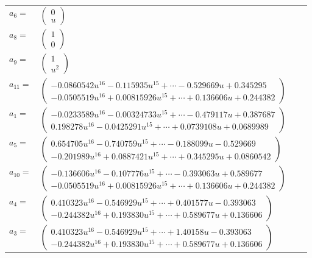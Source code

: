 \documentclass[1p]{elsarticle_modified}
\theoremstyle{definition}
\begin{document}
\begin{tabular}{m{7pt} m{180pt} m{7pt} m{180pt} }
\flushright $a_{6}=$&$\begin{pmatrix}0\\u\end{pmatrix}$ \\
\flushright $a_{8}=$&$\begin{pmatrix}1\\0\end{pmatrix}$ \\
\flushright $a_{9}=$&$\begin{pmatrix}1\\u^2\end{pmatrix}$ \\
\flushright $a_{11}=$&$\begin{pmatrix}-0.0860542 u^{16}-0.115935 u^{15}+\cdots-0.529669 u+0.345295\\-0.0505519 u^{16}+0.00815926 u^{15}+\cdots+0.136606 u+0.244382\end{pmatrix}$ \\
\flushright $a_{1}=$&$\begin{pmatrix}-0.0233589 u^{16}-0.00324733 u^{15}+\cdots-0.479117 u+0.387687\\0.198278 u^{16}-0.0425291 u^{15}+\cdots+0.0739108 u+0.0689989\end{pmatrix}$ \\
\flushright $a_{5}=$&$\begin{pmatrix}0.654705 u^{16}-0.740759 u^{15}+\cdots-0.188099 u-0.529669\\-0.201989 u^{16}+0.0887421 u^{15}+\cdots+0.345295 u+0.0860542\end{pmatrix}$ \\
\flushright $a_{10}=$&$\begin{pmatrix}-0.136606 u^{16}-0.107776 u^{15}+\cdots-0.393063 u+0.589677\\-0.0505519 u^{16}+0.00815926 u^{15}+\cdots+0.136606 u+0.244382\end{pmatrix}$ \\
\flushright $a_{4}=$&$\begin{pmatrix}0.410323 u^{16}-0.546929 u^{15}+\cdots+0.401577 u-0.393063\\-0.244382 u^{16}+0.193830 u^{15}+\cdots+0.589677 u+0.136606\end{pmatrix}$ \\
\flushright $a_{3}=$&$\begin{pmatrix}0.410323 u^{16}-0.546929 u^{15}+\cdots+1.40158 u-0.393063\\-0.244382 u^{16}+0.193830 u^{15}+\cdots+0.589677 u+0.136606\end{pmatrix}$ \\

\end{tabular}
\end{document}
